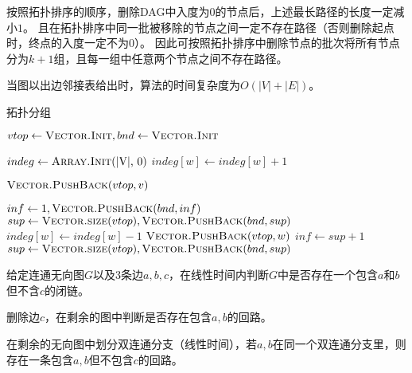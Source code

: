 \documentclass[answers]{exam}
\begin{document}
\begin{questions}
\begin{solution}
        按照拓扑排序的顺序，删除DAG中入度为$0$的节点后，上述最长路径的长度一定减小$1$。
        且在拓扑排序中同一批被移除的节点之间一定不存在路径（否则删除起点时，终点的入度一定不为0）。
        因此可按照拓扑排序中删除节点的批次将所有节点分为$k+1$组，且每一组中任意两个节点之间不存在路径。

        当图以出边邻接表给出时，算法的时间复杂度为$O(|V| + |E|)$。

        \begin{algorithm}[H]
            \caption{拓扑分组} \label{alg:0413:02}
            \begin{algorithmic}[1]

                \State $vtop \gets \Call{Vector.Init}{}, bnd \gets \Call{Vector.Init}{}$

                \State $indeg \gets \Call{Array.Init}{$|V|, 0$}$  
                \State $indeg[w] \gets indeg[w] + 1$
                \EndFor

                 
                \State $\Call{Vector.PushBack}{vtop, v}$
                \EndFor

                \Statex {}
                \State $inf \gets 1, \Call{Vector.PushBack}{bnd, inf}$
                \State $sup \gets \Call{Vector.size}{vtop}, \Call{Vector.PushBack}{bnd, sup}$
                 
                 
                \State $indeg[w] \gets indeg[w] - 1$ 
                 
                \State $\Call{Vector.PushBack}{vtop, w}$
                \EndIf
                \EndFor
                \EndFor
                \State $inf \gets sup + 1$
                \State $sup \gets \Call{Vector.size}{vtop}, \Call{Vector.PushBack}{bnd, sup}$
                \EndWhile
            \end{algorithmic}
        \end{algorithm}

    \end{solution}

    \question 给定连通无向图$G$以及3条边$a,b,c$，在线性时间内判断$G$中是否存在一个包含$a$和$b$但不含$c$的闭链。

    \begin{solution}
        删除边$c$，在剩余的图中判断是否存在包含$a,b$的回路。

        在剩余的无向图中划分双连通分支（线性时间），若$a,b$在同一个双连通分支里，则存在一条包含$a,b$但不包含$c$的回路。
    \end{solution}

\end{questions}
\end{document}
